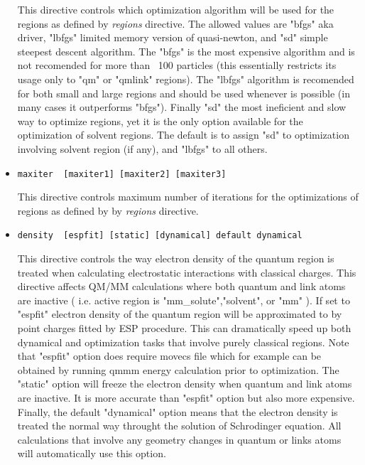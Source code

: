 \begin{itemize}
This directive controls which optimization algorithm will be used for the regions as defined
by {\it regions} directive. The allowed values are "bfgs" aka driver, "lbfgs" limited memory version of quasi-newton,
and "sd" simple steepest descent algorithm. The "bfgs" is the most expensive algorithm and is not 
recomended for more than ~100 particles (this essentially restricts its usage only to "qm" or "qmlink" regions).
The "lbfgs" algorithm is recomended for both small and large regions and should be used whenever is possible (in many
cases it outperforms "bfgs"). Finally "sd" the most ineficient and slow way to optimize regions, yet it is the only option
available for the optimization of solvent regions. The default is to assign "sd" to optimization involving solvent region (if any),
and "lbfgs" to all others.



\item
\begin{verbatim}
maxiter  [maxiter1] [maxiter2] [maxiter3]
\end{verbatim}

This directive controls maximum number of iterations for the optimizations of regions as defined by
by {\it regions} directive. 



\item
\begin{verbatim}
density  [espfit] [static] [dynamical] default dynamical
\end{verbatim}

This directive controls the way electron density of the quantum region is treated when calculating
electrostatic interactions with classical charges. This directive affects QM/MM calculations where both
quantum and link atoms are inactive ( i.e. active region is "mm{\_}solute","solvent", or "mm" ).
If set to "espfit" electron density of the quantum region will be approximated to by point charges
fitted by ESP procedure. This can dramatically speed up both dynamical and optimization tasks that involve purely classical regions.
Note that "espfit" option does require movecs file which for example
can be obtained by running qmmm energy calculation prior to optimization. 
The "static" option will freeze the electron density when quantum and link atoms are inactive. It is more accurate than
"espfit" option but also more expensive. Finally, the default "dynamical" option means that the electron density
is treated the normal way throught the solution of Schrodinger equation. All calculations that involve any geometry
changes in quantum or links atoms will automatically use this option.


\end{itemize}
